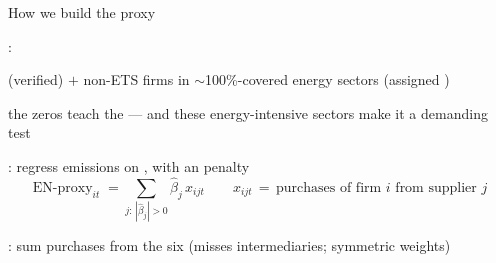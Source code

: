 \begin{frame}{How we build the proxy}

    \begin{wideitemize}
        \item \textbf{}:
        \begin{wideitemize}
            \item[-]  (verified) $+$ non-ETS firms in $\sim$100\%-covered energy sectors (assigned )
            \item[-] the zeros teach the  --- and these energy-intensive sectors make it a demanding test
        \end{wideitemize}

        \item \textbf{}: regress emissions on , with an  penalty
        $$ \text{EN-proxy}_{it} \;=\!\! \sum_{j:\,|\hat\beta_j|>0}\!\! \hat\beta_j\, x_{ijt}
            \qquad {\scriptstyle x_{ijt}\,=\,\text{purchases of firm } i \text{ from supplier } j} $$

        \item \textbf{}: sum purchases from the six  (misses intermediaries; symmetric weights)
    \end{wideitemize}

\end{frame}

